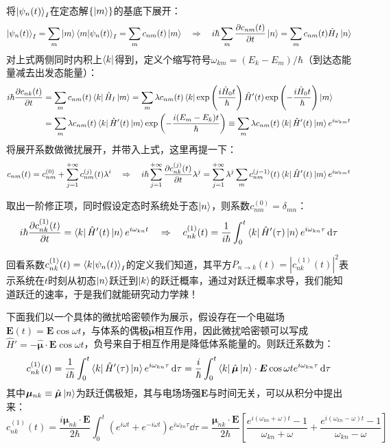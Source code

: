 将$\ket{\psi_n(t)}_I$在定态解$\{\ket{m}\}$的基底下展开：
\[\ket{\psi_n(t)}_I=\sum_m\ket{m}\bra{m}\ket{\psi_n(t)}_I=\sum_mc_{nm}(t)\ket{m} \quad \Rightarrow \quad i\hbar\sum_m\pdv{c_{nm}(t)}{t}\ket{n}=\sum_mc_{nm}(t)\hat{H}_I\ket{n}\]
对上式两侧同时内积上$\bra{k}$得到，定义个缩写符号$\omega_{km}=(E_k-E_m)/\hbar$（到达态能量减去出发态能量）：
\[\begin{aligned}
i\hbar\pdv{c_{nk}(t)}{t}&=\sum_mc_{nm}(t)\bra{k}\hat{H}_I\ket{m}=\sum_m\lambda c_{nm}(t)\bra{k}\exp\left(\frac{i\hat{H}_0t}{\hbar}\right)\hat{H}'(t)\exp\left(-\frac{i\hat{H}_0t}{\hbar}\right)\ket{m}\\
&=\sum_m\lambda c_{nm}(t)\bra{k}\hat{H}'(t)\ket{m}\exp\left(-\frac{i(E_m-E_k)t}{\hbar}\right)\equiv\sum_m\lambda c_{nm}(t)\bra{k}\hat{H}'(t)\ket{m}e^{i\omega_{km}t}
\end{aligned}\]
将展开系数做微扰展开，并带入上式，这里再提一下：
\[c_{nm}(t)=c_{nm}^{(0)}+\sum_{j=1}^{+\infty}c_{nm}^{(j)}(t)\lambda^i \quad \Rightarrow \quad i\hbar\sum_{j=1}^{+\infty}\pdv{c_{nk}^{(j)}(t)}{t}\lambda^j=\sum_{j=1}^{+\infty}\lambda^j\sum_mc^{(j-1)}_{nm}(t)\bra{k}\hat{H}'(t)\ket{m}e^{i\omega_{km}t}\]

取出一阶修正项，同时假设定态时系统处于态$\ket{n}$，则系数$c^{(0)}_{nm}=\delta_{mn}$：
\[i\hbar\pdv{c_{nk}^{(1)}(t)}{t}=\bra{k}\hat{H}'(t)\ket{n}e^{i\omega_{kn}t} \quad \Rightarrow \quad c_{nk}^{(1)}(t)=\frac{1}{i\hbar}\int_{0}^{t}\bra{k}\hat{H}'(\tau)\ket{n}e^{i\omega_{kn}\tau}\dd{\tau}\]

回看系数$c_{nk}^{(1)}(t)=\bra{k}\ket{\psi_n(t)}_I$的定义我们知道，其平方$P_{n \to k}(t)=|c_{nk}^{(1)}(t)|^2$表示系统在$t$时刻从初态$\ket{n}$跃迁到$\ket{k}$的跃迁概率，通过对跃迁概率求导，我们能知道跃迁的速率，于是我们就能研究动力学辣！

下面我们以一个具体的微扰哈密顿作为展示，假设存在一个电磁场$\bm{E}(t)=\bm{E}\cos{\omega t}$，与体系的偶极$\hat{\bm{\mu}}$相互作用，因此微扰哈密顿可以写成$\hat{H}'=-\hat{\bm{\mu}}\cdot\bm{E}\cos{\omega t}$，负号来自于相互作用是降低体系能量的。则跃迁系数为：
\[c_{nk}^{(1)}(t)=\frac{1}{i\hbar}\int_{0}^{t}\bra{k}\hat{H}'(\tau)\ket{n}e^{i\omega_{kn}\tau}\dd{\tau}=\frac{i}{\hbar}\int_{0}^{t}\bra{k}\hat{\bm{\mu}}\ket{n}\cdot \bm{E}\cos{\omega t}e^{i\omega_{kn}\tau}\dd{\tau}\]
其中$\bm{\mu}_{nk}\equiv\hat{\bm{\mu}}\ket{n}$为跃迁偶极矩，其与电场场强$\bm{E}$与时间无关，可以从积分中提出来：
\[c_{nk}^{(1)}(t)=\frac{i\bm{\mu}_{nk}\cdot\bm{E}}{2\hbar}\int_{0}^{t}(e^{i\omega t}+e^{-i\omega t})e^{i\omega_{kn}\tau}\dd{\tau}=\frac{\bm{\mu}_{nk}\cdot\bm{E}}{2\hbar}\left[\frac{e^{i(\omega_{kn}+\omega)t}-1}{\omega_{kn}+\omega}+\frac{e^{i(\omega_{kn}-\omega)t}-1}{\omega_{kn}-\omega} \right]\]


